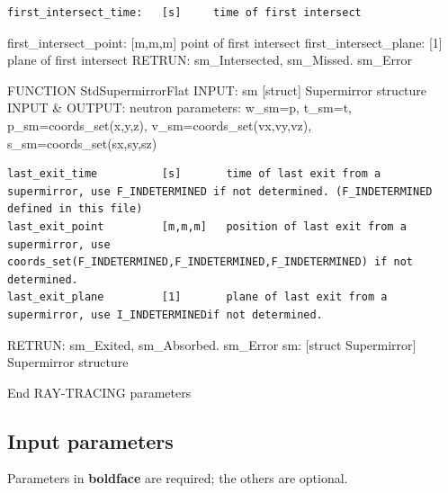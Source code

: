 \begin{verbatim}
first_intersect_time:   [s]		time of first intersect
\end{verbatim}

first\_intersect\_point: [m,m,m] point of first intersect first\_intersect\_plane: [1] plane of first intersect RETRUN: sm\_Intersected, sm\_Missed. sm\_Error

FUNCTION StdSupermirrorFlat INPUT: sm [struct] Supermirror structure INPUT \& OUTPUT: neutron parameters: w\_sm=p, t\_sm=t, p\_sm=coords\_set(x,y,z), v\_sm=coords\_set(vx,vy,vz), s\_sm=coords\_set(sx,sy,sz)

\begin{verbatim}
last_exit_time			[s]       time of last exit from a supermirror, use F_INDETERMINED if not determined. (F_INDETERMINED defined in this file)
last_exit_point			[m,m,m]   position of last exit from a supermirror, use coords_set(F_INDETERMINED,F_INDETERMINED,F_INDETERMINED) if not determined.
last_exit_plane			[1]       plane of last exit from a supermirror, use I_INDETERMINEDif not determined.
\end{verbatim}

RETRUN: sm\_Exited, sm\_Absorbed. sm\_Error sm: [struct Supermirror] Supermirror structure

End RAY-TRACING parameters

\subsection*{Input parameters}
Parameters in \textbf{boldface} are required; the others are optional.

